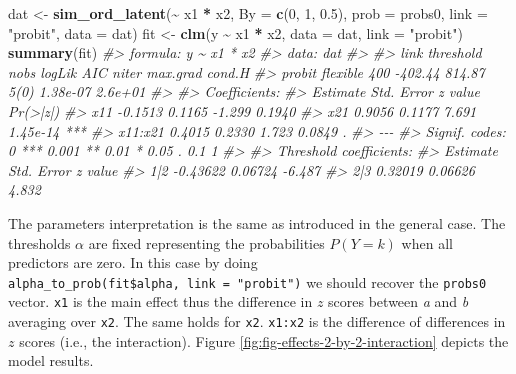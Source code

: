 \documentclass[
  man,floatsintext]{apa6}
\newenvironment{Shaded}{\begin{snugshade}}{\end{snugshade}}
\newcommand{\AttributeTok}[1]{\textcolor[rgb]{0.13,0.29,0.53}{#1}}
\newcommand{\CommentTok}[1]{\textcolor[rgb]{0.56,0.35,0.01}{\textit{#1}}}
\newcommand{\DecValTok}[1]{\textcolor[rgb]{0.00,0.00,0.81}{#1}}
\newcommand{\FloatTok}[1]{\textcolor[rgb]{0.00,0.00,0.81}{#1}}
\newcommand{\FunctionTok}[1]{\textcolor[rgb]{0.13,0.29,0.53}{\textbf{#1}}}
\newcommand{\NormalTok}[1]{#1}
\newcommand{\OtherTok}[1]{\textcolor[rgb]{0.56,0.35,0.01}{#1}}
\newcommand{\SpecialCharTok}[1]{\textcolor[rgb]{0.81,0.36,0.00}{\textbf{#1}}}
\newcommand{\StringTok}[1]{\textcolor[rgb]{0.31,0.60,0.02}{#1}}
\begin{document}
\begin{Shaded}
\begin{Highlighting}[]
\NormalTok{dat }\OtherTok{\textless{}{-}} \FunctionTok{sim\_ord\_latent}\NormalTok{(}\SpecialCharTok{\textasciitilde{}}\NormalTok{ x1 }\SpecialCharTok{*}\NormalTok{ x2, }\AttributeTok{By =} \FunctionTok{c}\NormalTok{(}\DecValTok{0}\NormalTok{, }\DecValTok{1}\NormalTok{, }\FloatTok{0.5}\NormalTok{), }\AttributeTok{prob =}\NormalTok{ probs0, }\AttributeTok{link =} \StringTok{"probit"}\NormalTok{, }\AttributeTok{data =}\NormalTok{ dat)}
\NormalTok{fit }\OtherTok{\textless{}{-}} \FunctionTok{clm}\NormalTok{(y }\SpecialCharTok{\textasciitilde{}}\NormalTok{ x1 }\SpecialCharTok{*}\NormalTok{ x2, }\AttributeTok{data =}\NormalTok{ dat, }\AttributeTok{link =} \StringTok{"probit"}\NormalTok{)}
\FunctionTok{summary}\NormalTok{(fit)}
\CommentTok{\#\textgreater{} formula: y \textasciitilde{} x1 * x2}
\CommentTok{\#\textgreater{} data:    dat}
\CommentTok{\#\textgreater{} }
\CommentTok{\#\textgreater{}  link   threshold nobs logLik  AIC    niter max.grad cond.H }
\CommentTok{\#\textgreater{}  probit flexible  400  {-}402.44 814.87 5(0)  1.38e{-}07 2.6e+01}
\CommentTok{\#\textgreater{} }
\CommentTok{\#\textgreater{} Coefficients:}
\CommentTok{\#\textgreater{}         Estimate Std. Error z value Pr(\textgreater{}|z|)    }
\CommentTok{\#\textgreater{} x11      {-}0.1513     0.1165  {-}1.299   0.1940    }
\CommentTok{\#\textgreater{} x21       0.9056     0.1177   7.691 1.45e{-}14 ***}
\CommentTok{\#\textgreater{} x11:x21   0.4015     0.2330   1.723   0.0849 .  }
\CommentTok{\#\textgreater{} {-}{-}{-}}
\CommentTok{\#\textgreater{} Signif. codes:  0 \textquotesingle{}***\textquotesingle{} 0.001 \textquotesingle{}**\textquotesingle{} 0.01 \textquotesingle{}*\textquotesingle{} 0.05 \textquotesingle{}.\textquotesingle{} 0.1 \textquotesingle{} \textquotesingle{} 1}
\CommentTok{\#\textgreater{} }
\CommentTok{\#\textgreater{} Threshold coefficients:}
\CommentTok{\#\textgreater{}     Estimate Std. Error z value}
\CommentTok{\#\textgreater{} 1|2 {-}0.43622    0.06724  {-}6.487}
\CommentTok{\#\textgreater{} 2|3  0.32019    0.06626   4.832}
\end{Highlighting}
\end{Shaded}

\normalsize

The parameters interpretation is the same as introduced in the general case. The thresholds \(\alpha\) are fixed representing the probabilities \(P(Y = k)\) when all predictors are zero. In this case by doing \texttt{alpha\_to\_prob(fit\$alpha,\ link\ =\ "probit")} we should recover the \texttt{probs0} vector. \texttt{x1} is the main effect thus the difference in \(z\) scores between \emph{a} and \emph{b} averaging over \texttt{x2}. The same holds for \texttt{x2}. \texttt{x1:x2} is the difference of differences in \(z\) scores (i.e., the interaction). Figure \ref{fig:fig-effects-2-by-2-interaction} depicts the model results.
\end{document}

